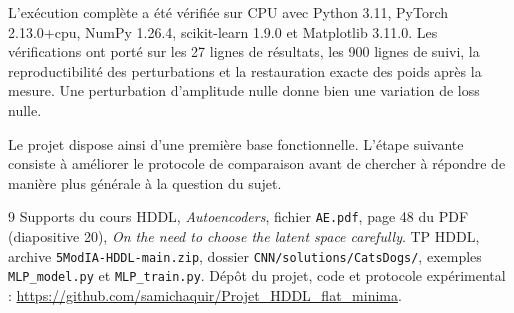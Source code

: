 \documentclass[11pt,a4paper]{article}
\begin{document}
L'exécution complète a été vérifiée sur CPU avec Python 3.11, PyTorch 2.13.0+cpu, NumPy 1.26.4, scikit-learn 1.9.0 et Matplotlib 3.11.0. Les vérifications ont porté sur les 27 lignes de résultats, les 900 lignes de suivi, la reproductibilité des perturbations et la restauration exacte des poids après la mesure. Une perturbation d'amplitude nulle donne bien une variation de loss nulle.

Le projet dispose ainsi d'une première base fonctionnelle. L'étape suivante consiste à améliorer le protocole de comparaison avant de chercher à répondre de manière plus générale à la question du sujet.

\begin{thebibliography}{9}
 Supports du cours HDDL, \emph{Autoencoders}, fichier \texttt{AE.pdf}, page 48 du PDF (diapositive 20), \emph{On the need to choose the latent space carefully}.
 TP HDDL, archive \texttt{5ModIA-HDDL-main.zip}, dossier \texttt{CNN/solutions/CatsDogs/}, exemples \texttt{MLP\_model.py} et \texttt{MLP\_train.py}.
 Dépôt du projet, code et protocole expérimental : \url{https://github.com/samichaquir/Projet_HDDL_flat_minima}.
\end{thebibliography}
\end{document}
